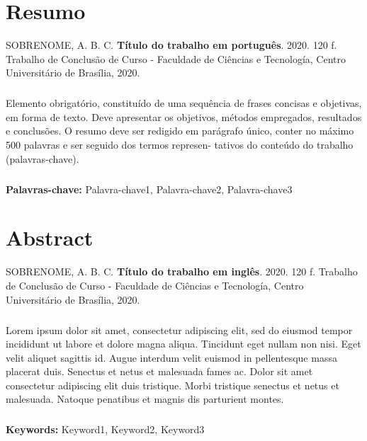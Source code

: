 \chapter{Resumo}

SOBRENOME, A. B. C. \textbf{Título do trabalho em português}. 2020. 120 f. Trabalho de Conclusão de Curso - Faculdade de Ciências e Tecnología, Centro Universitário de Brasília, 2020.

\paragraph{}
Elemento obrigatório, constituído de uma sequência de frases concisas e objetivas, em forma de texto. Deve apresentar os objetivos, métodos empregados, resultados e conclusões. O resumo deve ser redigido em parágrafo único, conter no máximo 500 palavras e ser seguido dos termos represen- tativos do conteúdo do trabalho (palavras-chave).

\paragraph{}
\textbf{Palavras-chave:} Palavra-chave1, Palavra-chave2, Palavra-chave3

\chapter{Abstract}

SOBRENOME, A. B. C. \textbf{Título do trabalho em inglês}. 2020. 120 f. Trabalho de Conclusão de Curso - Faculdade de Ciências e Tecnología, Centro Universitário de Brasília, 2020.

\paragraph{}
Lorem ipsum dolor sit amet, consectetur adipiscing elit, sed do eiusmod tempor incididunt ut labore et dolore magna aliqua. Tincidunt eget nullam non nisi. Eget velit aliquet sagittis id. Augue interdum velit euismod in pellentesque massa placerat duis. Senectus et netus et malesuada fames ac. Dolor sit amet consectetur adipiscing elit duis tristique. Morbi tristique senectus et netus et malesuada. Natoque penatibus et magnis dis parturient montes.

\paragraph{}
\textbf{Keywords:} Keyword1, Keyword2, Keyword3